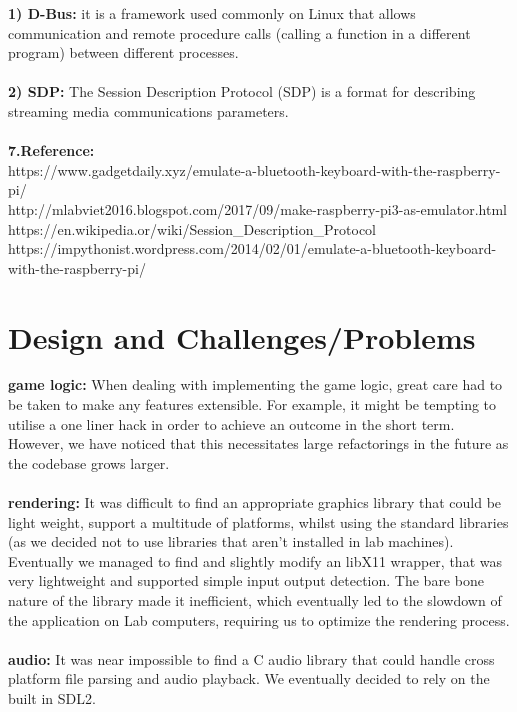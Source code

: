 \documentclass[a4paper]{article}
\begin{document}
\textbf{1) D-Bus:} it is a framework used commonly on Linux that allows communication and remote procedure calls (calling a function in a different program) between different processes. \\\\
\textbf{2) SDP:} The Session Description Protocol (SDP) is a format for describing streaming media communications parameters. 
\\\\
\textbf{7.Reference:}\\
https://www.gadgetdaily.xyz/emulate-a-bluetooth-keyboard-with-the-raspberry-pi/\\
http://mlabviet2016.blogspot.com/2017/09/make-raspberry-pi3-as-emulator.html\\
https://en.wikipedia.or/wiki/Session\_Description\_Protocol\\
https://impythonist.wordpress.com/2014/02/01/emulate-a-bluetooth-keyboard-with-the-raspberry-pi/\\


\section{Design and Challenges/Problems}
\textbf{game logic:} When dealing with implementing the game logic, great care had to be taken to make any features extensible. For example, it might be tempting to utilise a one liner hack in order to achieve an outcome in the short term. However, we have noticed that this necessitates large refactorings in the future as the codebase grows larger.
\\\\
\textbf{rendering:} It was difficult to find an appropriate graphics library that could be light weight, support a multitude of platforms, whilst using the standard libraries (as we decided not to use libraries that aren't installed in lab machines). Eventually we managed to find and slightly modify an libX11 wrapper, that was very lightweight and supported simple input output detection. The bare bone nature of the library made it inefficient, which eventually led to the slowdown of the application on Lab computers, requiring us to optimize the rendering process. 
\\\\
\textbf{audio:} It was near impossible to find a C audio library that could handle cross platform file parsing and audio playback. We eventually decided to rely on the built in SDL2.
\end{document}
